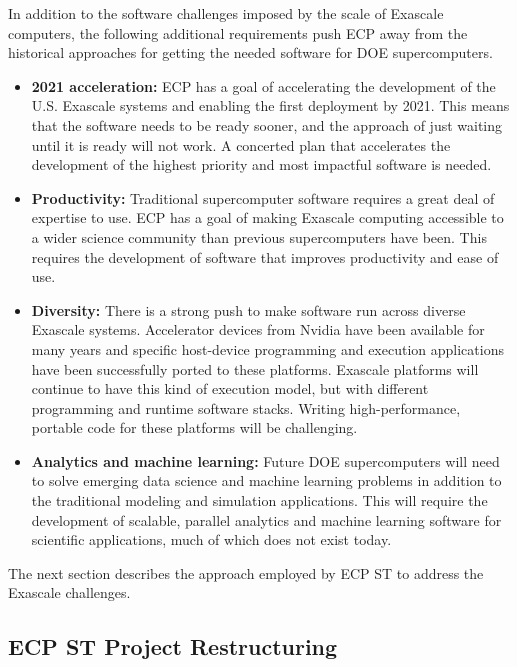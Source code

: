 In addition to the software challenges imposed by the scale of Exascale computers, the following additional requirements push ECP away from the historical approaches for getting the needed software for DOE supercomputers.
\begin{itemize}
\item \textbf{2021 acceleration:} ECP has a goal of accelerating the development of the U.S. Exascale systems and enabling the first deployment by 2021. This means that the software needs to be ready sooner, and the approach of just waiting until it is ready will not work. A concerted plan that accelerates the development of the highest priority and most impactful software is needed.
\item \textbf{Productivity:} Traditional supercomputer software requires a great deal of expertise to use. ECP has a goal of making Exascale computing accessible to a wider science community than previous supercomputers have been. This requires the development of software that improves productivity and ease of use.
\item \textbf{Diversity:} There is a strong push to make software run across diverse Exascale systems. Accelerator devices from Nvidia have been available for many years and specific host-device programming and execution applications have been successfully ported to these platforms.  Exascale platforms will continue to have this kind of execution model, but with different programming and runtime software stacks.  Writing high-performance, portable code for these platforms will be challenging.
\item \textbf{Analytics and machine learning:} Future DOE supercomputers will need to solve emerging data science and machine learning problems in addition to the traditional modeling and simulation applications. This will require the development of scalable, parallel analytics and machine learning software for scientific applications, much of which does not exist today.
\end{itemize}
 
The next section describes the approach employed by ECP ST to address the Exascale challenges.

\subsection{ECP ST Project Restructuring}\label{subsect:ProjectRestructuring}


